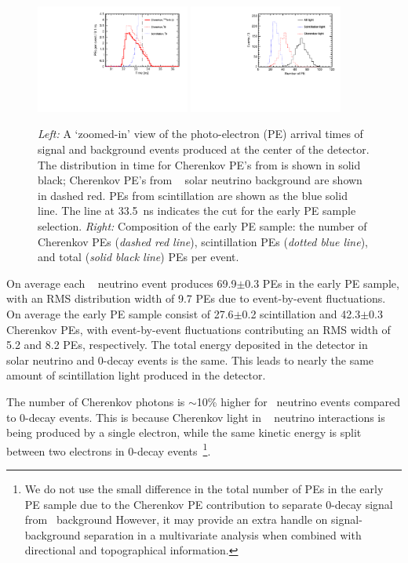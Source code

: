 \begin{figure}[ht]

  \centering
  \includegraphics[width=0.45\textwidth]{hTche_Te130_B8_v2.pdf}
\hfil
  \includegraphics[width=0.45\textwidth]{hMomNPhot_1el_2p529MeV.pdf}
  \caption{\emph{Left:} A `zoomed-in' view of the photo-electron (PE)
   arrival times of signal and background events produced at the
   center of the detector.  The distribution in time for Cherenkov
   PE's from \nbb is shown in solid black; Cherenkov PE's from
   \B~ solar neutrino background are shown in dashed red. PEs from
   scintillation are shown as the blue solid line. The line at 33.5~ns
   indicates the cut for the early PE sample selection.  \emph{Right:}
   Composition of the early PE sample: the number of Cherenkov PEs
   (\emph{dashed red line}), scintillation PEs (\emph{dotted blue
   line}), and total (\emph{solid black line}) PEs per event.}

\label{fig:ArrivalTimeDist_B8}
\end{figure}


On average each \B~ neutrino event produces 69.9$\pm$0.3 PEs in the
early PE sample, with an RMS distribution width of 9.7 PEs due to
event-by-event fluctuations.  On average the early PE sample consist
of 27.6$\pm$0.2 scintillation and 42.3$\pm$0.3 Cherenkov PEs, with
event-by-event fluctuations contributing an RMS width of 5.2 and 8.2
PEs, respectively.  The total energy deposited in the detector in \B~
solar neutrino and 0\nbb-decay events is the same. This leads to
nearly the same amount of scintillation light produced in the
detector.

The number of Cherenkov photons is $\sim$10\% higher for \B~neutrino
events compared to 0\nbb-decay events. This is because Cherenkov light
in \B~ neutrino interactions is being produced by a single electron,
while the same kinetic energy is split between two electrons in
0\nbb-decay events~\footnote{We do not use the small difference in the
total number of PEs in the early PE sample due to the Cherenkov PE
contribution to separate 0\nbb-decay signal from \B~background
However, it may provide an extra handle on signal-background
separation in a multivariate analysis when combined with directional
and topographical information.}.


